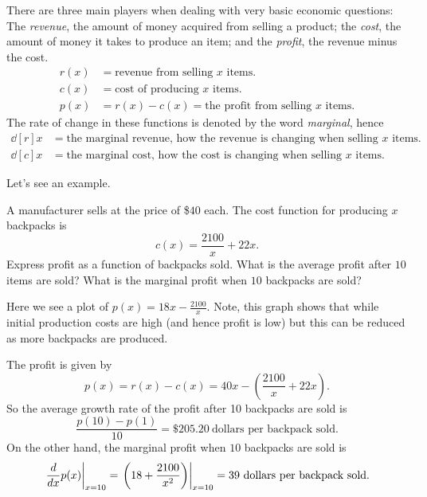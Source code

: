 There are three main players when dealing with very basic economic
questions: The \textit{revenue}, the amount of money acquired from
selling a product; the \textit{cost}, the amount of money it takes to
produce an item; and the \textit{profit}, the revenue minus the cost.
\begin{align*}
r(x) &= \text{revenue from selling $x$ items.}\\
c(x) &= \text{cost of producing $x$ items.}\\
p(x) &= r(x)-c(x) = \text{the profit from selling $x$ items}.
\end{align*}
The rate of change in these functions is denoted by the word \textit{marginal}, hence 
\begin{align*}
\dd[r]{x} &= \text{the marginal revenue, how the revenue is changing when selling $x$ items.}\\
\dd[c]{x} &= \text{the marginal cost, how the cost is changing when selling $x$ items.}
\end{align*}

Let's see an example.

\begin{example}
A manufacturer sells at the price of \$$40$ each. The cost function for producing $x$ backpacks is
\[
c(x) = \frac{2100}{x} + 22x.
\]
Express profit as a function of backpacks sold. What is the average
profit after $10$ items are sold? What is the marginal profit when
$10$ backpacks are sold?
\end{example}
\begin{marginfigure}
\caption{Here we see a plot of $p(x) = 18x - \frac{2100}{x}$. Note,
  this graph shows that while initial production costs are high (and
  hence profit is low) but this can be reduced as more backpacks are
  produced.}
\end{marginfigure}
\begin{solution}
The profit is given by
\[
p(x) = r(x) - c(x)  = 40x - \left(\frac{2100}{x} + 22x\right).
\]
So the average growth rate of the profit after 10 backpacks are sold is
\[
\frac{p(10)-p(1)}{10} = \$205.20~\text{dollars per backpack sold}.
\]
On the other hand, the marginal profit when $10$ backpacks are sold is
\[
\left.\frac{d}{dx} p(x) \right|_{x=10} = \left.\left(18 + \frac{2100}{x^2}\right) \right|_{x=10} = 39~\text{dollars per backpack sold}.
\]

\end{solution}




